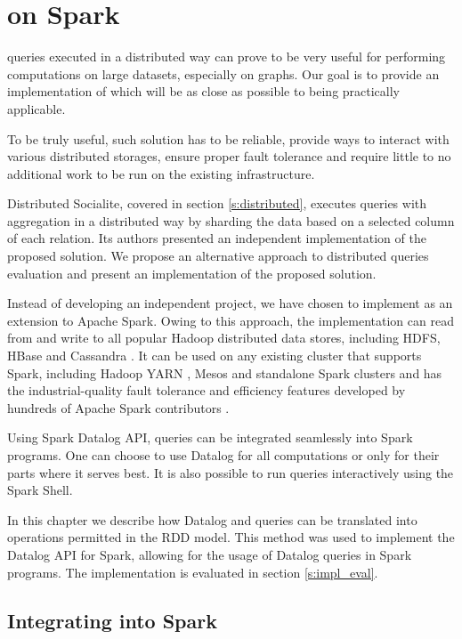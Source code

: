 

\chapter{\datalogra on Spark}\label{r:implementation}

\datalogra queries executed in a distributed way can prove to be very useful for performing computations on large datasets, especially on graphs. Our goal is to provide an implementation of \datalogra which will be as close as possible to being practically applicable.

To be truly useful, such solution has to be reliable, provide ways to interact with various distributed storages, ensure proper fault tolerance and require little to no additional work to be run on the existing infrastructure.

Distributed Socialite, covered in section \ref{s:distributed}, executes queries with aggregation in a distributed way by sharding the data based on a selected column of each relation. Its authors presented an independent implementation of the proposed solution. We propose an alternative approach to distributed \datalogra queries evaluation and present an implementation of the proposed solution.

Instead of developing an independent project, we have chosen to implement \datalogra as an extension to Apache Spark. Owing to this approach, the implementation can read from and write to all popular Hadoop distributed data stores, including HDFS, HBase and Cassandra \cite{sparkwww}. It can be used on any existing cluster that supports Spark, including Hadoop YARN \cite{hadoop}, Mesos and standalone Spark clusters \cite{sparkwww} and has the industrial-quality fault tolerance and efficiency features developed by hundreds of Apache Spark contributors \cite{githubspark}. 

Using Spark Datalog API, \datalogra queries can be integrated seamlessly into Spark programs. One can choose to use Datalog for all computations or only for their parts where it serves best. It is also possible to run \datalogra queries interactively using the Spark Shell.

In this chapter we describe how Datalog and \datalogra queries can be translated into operations permitted in the RDD model. This method was used to implement the Datalog API for Spark, allowing for the usage of Datalog queries in Spark programs. The implementation is evaluated in section \ref{s:impl_eval}.

\section{Integrating \datalogra into Spark}

